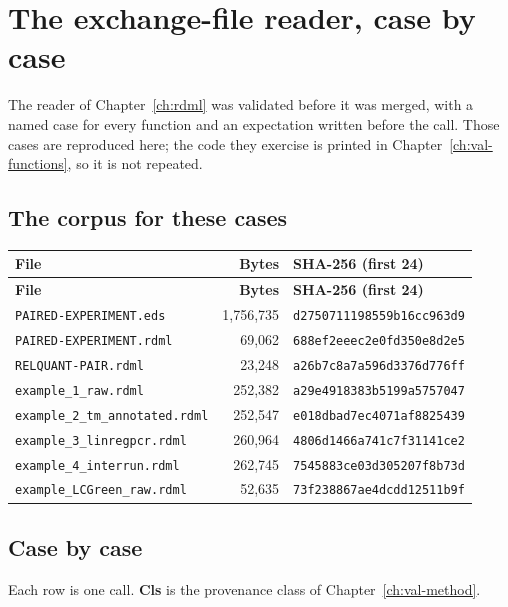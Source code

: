 \chapter{The exchange-file reader, case by case}\label{ch:val-rdml}

The reader of Chapter~\ref{ch:rdml} was validated before it was merged, with a
named case for every function and an expectation written before the call. Those
cases are reproduced here; the code they exercise is printed in
Chapter~\ref{ch:val-functions}, so it is not repeated.

\section{The corpus for these cases}

{\small
\begin{xltabular}{\linewidth}{|X|r|l|}
\toprule \textbf{File} & \textbf{Bytes} & \textbf{SHA-256 (first 24)} \\\midrule\endfirsthead
\toprule \textbf{File} & \textbf{Bytes} & \textbf{SHA-256 (first 24)} \\\midrule\endhead
\texttt{PAIRED-EXPERIMENT.eds} & 1,756,735 & \texttt{d2750711198559b16cc963d9} \\
\texttt{PAIRED-EXPERIMENT.rdml} & 69,062 & \texttt{688ef2eeec2e0fd350e8d2e5} \\
\texttt{RELQUANT-PAIR.rdml} & 23,248 & \texttt{a26b7c8a7a596d3376d776ff} \\
\texttt{example\_1\_raw.rdml} & 252,382 & \texttt{a29e4918383b5199a5757047} \\
\texttt{example\_2\_tm\_annotated.rdml} & 252,547 & \texttt{e018dbad7ec4071af8825439} \\
\texttt{example\_3\_linregpcr.rdml} & 260,964 & \texttt{4806d1466a741c7f31141ce2} \\
\texttt{example\_4\_interrun.rdml} & 262,745 & \texttt{7545883ce03d305207f8b73d} \\
\texttt{example\_LCGreen\_raw.rdml} & 52,635 & \texttt{73f238867ae4dcdd12511b9f} \\
\bottomrule
\end{xltabular}}


\section{Case by case}
Each row is one call. \textbf{Cls} is the provenance class of
Chapter~\ref{ch:val-method}.

